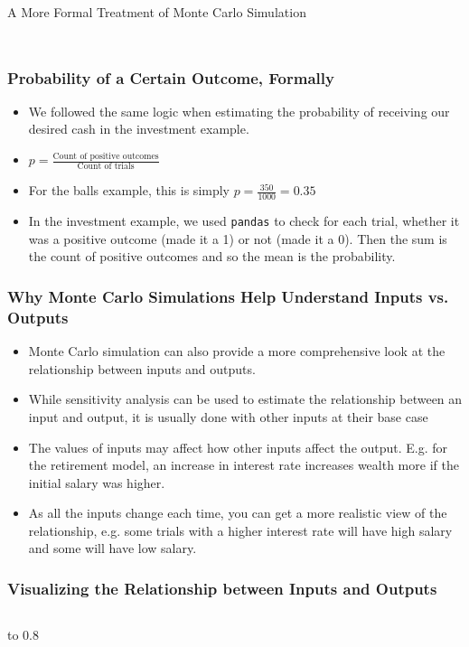 \documentclass[handout, 11pt]{beamer}
\begin{document}
\begin{section}[Formal MC]{A More Formal Treatment of Monte Carlo Simulation}
\begin{frame}
\begin{columns}
\begin{column}{0.5\textwidth}
{\vfill
\vfill}
\end{column}
\end{columns}
\end{frame}
\begin{frame}
\frametitle{Probability of a Certain Outcome, Formally}
\begin{itemize}
\item We followed the same logic when estimating the probability of receiving our desired cash in the investment example.
\vfill
\item $p = \frac{\text{Count of positive outcomes}}{\text{Count of trials}}$
\vfill
\item For the balls example, this is simply
$p = \frac{350}{1000} = 0.35$
\vfill
\item In the investment example, we used
\texttt{pandas}
to check for each trial, whether it was a positive outcome (made it a 1) or not (made it a 0). Then the sum is the count of positive outcomes and so the mean is the probability.
\end{itemize}
\end{frame}
\begin{frame}
\frametitle{Why Monte Carlo Simulations Help Understand Inputs vs. Outputs}
\begin{itemize}
\item Monte Carlo simulation can also provide a more comprehensive look at the relationship between inputs and outputs.
\vfill
\item While sensitivity analysis can be used to estimate the relationship between an input and output, it is usually done with other inputs at their base case
\vfill
\item The values of inputs may affect how other inputs affect the output. E.g. for the retirement model, an increase in interest rate increases wealth more if the initial salary was higher.
\vfill
\item As all the inputs change each time, you can get a more realistic view of the relationship, e.g. some trials with a higher interest rate will have high salary and some will have low salary.
\end{itemize}
\end{frame}
\begin{frame}
\frametitle{Visualizing the Relationship between Inputs and Outputs}
\begin{columns}
\begin{column}{0.5\textwidth}
\vbox to 0.8
\end{column}
\end{columns}
\end{frame}
\end{section}
\end{document}
